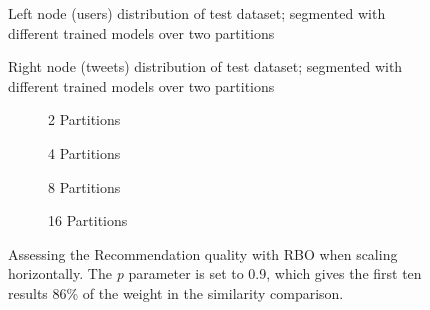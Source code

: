 
\begin{figure}[!htb]
	\centering
	
	\caption{Left node (users) distribution of test dataset; segmented with different trained models over two partitions}
	\label{plot:left-node-distribution}
\end{figure}

\begin{figure}[!htb]
	\centering
	
	\caption{Right node (tweets) distribution of test dataset; segmented with different trained models over two partitions}
	\label{plot:right-node-distribution}
\end{figure}




\begin{figure}[!htb]
	\centering
	\begin{subfigure}[b]{0.5\linewidth}
	  \centering
	  
	  \caption{2 Partitions} 
	  \label{fig:RBO-horizontall-scaling-2-partitions-a} 
	  \vspace{1cm}
	\end{subfigure}%
	\begin{subfigure}[b]{0.5\linewidth}
	  \centering
	  
	  \caption{4 Partitions} 
	  \label{fig:RBO-horizontall-scaling-4-partitions-b} 
	  \vspace{1cm}
	\end{subfigure} 
	\begin{subfigure}[b]{0.5\linewidth}
	  \centering
	  
	  \caption{8 Partitions} 
	  \label{fig:RBO-horizontall-scaling-8-partitions-c} 
	\end{subfigure}%
	\begin{subfigure}[b]{0.5\linewidth}
	  \centering
	  
	  \caption{16 Partitions} 
	  \label{fig:RBO-horizontall-scaling-16-partitions-d} 
	\end{subfigure} 
	\caption{Assessing the Recommendation quality with RBO when scaling horizontally. The \emph{p} parameter is set to 0.9, which gives the first ten results 86\% of the weight in the similarity comparison.}
	\label{fig:RBO-horizontall-scaling} 
\end{figure}
